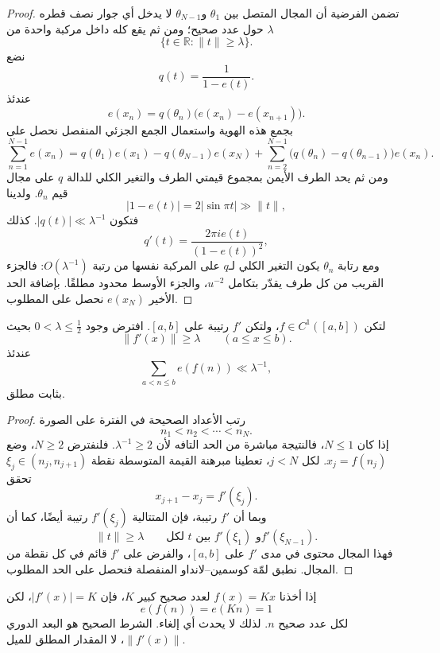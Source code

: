 \begin{proof}
تضمن الفرضية أن المجال المتصل بين \(\theta_1\) و\(\theta_{N-1}\) لا يدخل أي جوار نصف قطره \(\lambda\) حول عدد صحيح؛ ومن ثم يقع كله داخل مركبة واحدة من
\[
\{t\in\mathbb R:\|t\|\ge\lambda\}.
\]
نضع
\[
q(t)=\frac{1}{1-e(t)}.
\]
عندئذ
\[
e(x_n)=q(\theta_n)\bigl(e(x_n)-e(x_{n+1})\bigr).
\]
بجمع هذه الهوية واستعمال الجمع الجزئي المنفصل نحصل على
\[
\sum_{n=1}^{N-1}e(x_n)
=q(\theta_1)e(x_1)-q(\theta_{N-1})e(x_N)
+\sum_{n=2}^{N-1}\bigl(q(\theta_n)-q(\theta_{n-1})\bigr)e(x_n).
\]
ومن ثم يحد الطرف الأيمن بمجموع قيمتي الطرف والتغير الكلي للدالة \(q\) على مجال قيم \(\theta_n\). ولدينا
\[
|1-e(t)|=2|\sin \pi t|\gg \|t\|,
\]
فتكون \(|q(t)|\ll\lambda^{-1}\). كذلك
\[
q'(t)=\frac{2\pi i e(t)}{(1-e(t))^2},
\]
ومع رتابة \(\theta_n\) يكون التغير الكلي لـ\(q\) على المركبة نفسها من رتبة \(O(\lambda^{-1})\): فالجزء القريب من كل طرف يقدّر بتكامل \(u^{-2}\)، والجزء الأوسط محدود مطلقًا. بإضافة الحد الأخير \(e(x_N)\) نحصل على المطلوب.
\end{proof}

\begin{theorem}
\label{thm:first-derivative-test}
لتكن \(f\in C^1([a,b])\)، ولتكن \(f'\) رتيبة على \([a,b]\). افترض وجود \(0<\lambda\le\tfrac12\) بحيث
\[
\|f'(x)\|\ge\lambda
\qquad(a\le x\le b).
\]
عندئذ
\[
\sum_{a<n\le b}e(f(n))\ll \lambda^{-1},
\]
بثابت مطلق.
\provedhere
\end{theorem}

\begin{proof}
رتب الأعداد الصحيحة في الفترة على الصورة
\[
n_1<n_2<\cdots<n_N.
\]
إذا كان \(N\le1\)، فالنتيجة مباشرة من الحد التافه لأن \(\lambda^{-1}\ge2\). فلنفترض \(N\ge2\)، وضع \(x_j=f(n_j)\). لكل \(j<N\)، تعطينا مبرهنة القيمة المتوسطة نقطة \(\xi_j\in(n_j,n_{j+1})\) تحقق
\[
x_{j+1}-x_j=f'(\xi_j).
\]
وبما أن \(f'\) رتيبة، فإن المتتالية \(f'(\xi_j)\) رتيبة أيضًا، كما أن
\[
\|t\|\ge\lambda
\qquad
\text{لكل \(t\) بين \(f'(\xi_1)\) و\(f'(\xi_{N-1})\)}.
\]
فهذا المجال محتوى في مدى \(f'\) على \([a,b]\)، والفرض على \(f'\) قائم في كل نقطة من المجال.
نطبق لمّة كوسمين--لانداو المنفصلة فنحصل على الحد المطلوب.
\end{proof}

\begin{remark}
إذا أخذنا \(f(x)=Kx\) لعدد صحيح كبير \(K\)، فإن \(|f'(x)|=K\)، لكن
\[
e(f(n))=e(Kn)=1
\]
لكل عدد صحيح \(n\). لذلك لا يحدث أي إلغاء. الشرط الصحيح هو البعد الدوري \(\|f'(x)\|\)، لا المقدار المطلق للميل.
\end{remark}

